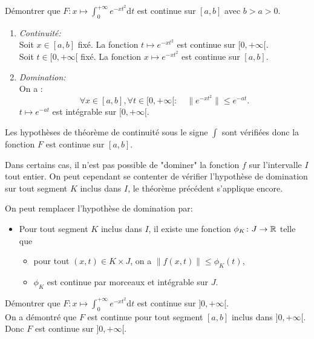 \documentclass{book}
\begin{document}
\begin{Exemple}Démontrer que $F:x\mapsto \int_{0}^{+\infty} e^{-xt^2} \mathrm dt$ est continue sur $[a,b]$ avec $b>a>0$.\\
\begin{enumerate}
\item \textit{Continuité:}\\ 
Soit $x\in [a,b]$ fixé. La fonction $t\mapsto e^{-xt^2}$ est continue  sur $[0,+\infty[$.\\
Soit $t\in [0,+\infty[$ fixé. La fonction $x\mapsto e^{-xt^2}$ est continue  sur  $[a,b]$.
\item  \textit{Domination:}\\
On a :
$$\forall x\in [a,b], \forall t\in [0,+\infty[: \quad  \|e^{-xt^2}\|\leq e^{-at}.$$
$t\mapsto e^{-at}$ est intégrable sur $[0,+\infty[$.\\
\end{enumerate}
Les hypothèses de théorème de continuité sous le signe $\int$ sont vérifiées donc la fonction $F$ est continue sur $[a,b]$.
\end{Exemple}
Dans certains cas, il n'est pas possible de "dominer" la fonction $f$ sur l'intervalle $I$ tout entier. On peut cependant se contenter de vérifier l'hypothèse de domination sur tout segment $K$ inclus dans $I$, le théorème précédent s'applique encore.
\begin{Theoreme}
On peut remplacer l'hypothèse de domination par:
\begin{itemize}
\item
  Pour tout segment $K$ inclus dans $I$,
  il existe une fonction $\phi_K \colon J \to \mathbb{R}$ telle que
  \begin{itemize}
  \item
    pour tout $(x,t)\in K\times J$, on a $\|f(x,t)\|\leq\phi _K(t)$,
  \item
    $\phi _K$ est continue par morceaux et intégrable sur $J$.
  \end{itemize}
\end{itemize}
\end{Theoreme}
\begin{Exemple}
Démontrer que $F:x\mapsto \int_{0}^{+\infty} e^{-xt^2}\mathrm dt$ est continue sur $]0,+\infty[$.\\
On a démontré que $F$  est continue pour tout segment $[a,b]$ inclus dans $]0,+\infty[$. Donc $F$ est continue sur $]0,+\infty[$. 
\end{Exemple}
\end{document}

